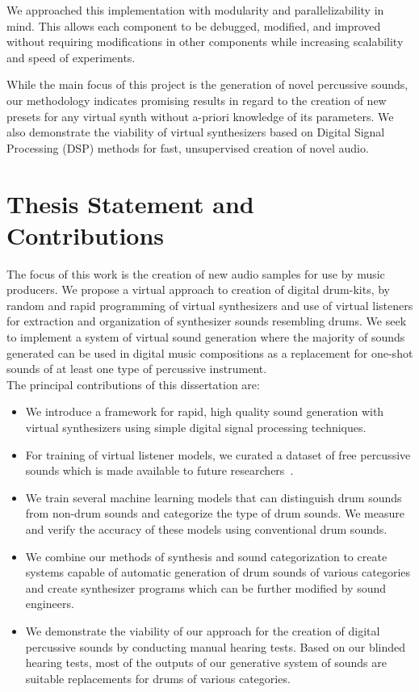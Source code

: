 \documentclass[\main/thesis.tex]{subfiles}
\begin{document}
We approached this implementation with modularity and parallelizability in mind. This allows each component to be debugged, modified, and improved without requiring modifications in other components while increasing scalability and speed of experiments. 


While the main focus of this project is the generation of novel percussive sounds, our methodology indicates promising results in regard to the creation of new presets for any virtual synth without a-priori knowledge of its parameters. We also demonstrate the viability of virtual synthesizers based on Digital Signal Processing (DSP) methods for fast, unsupervised creation of novel audio. 




\section{Thesis Statement and Contributions}
\label{sec:thesis_statement}
 The focus of this work is the creation of new audio samples for use by music producers. We propose a virtual approach to creation of digital drum-kits, by random and rapid programming of virtual synthesizers and use of virtual listeners for extraction and organization of synthesizer sounds resembling drums. We seek to implement a system of virtual sound generation where the majority of sounds generated can be used in digital music compositions as a replacement for one-shot sounds of at least one type of percussive instrument.\\
  
  The principal contributions of this dissertation are:
\begin{itemize}
  \item We introduce a framework for rapid, high quality sound generation with virtual synthesizers using simple digital signal processing techniques. 
  \item For training of virtual listener models, we curated a dataset of free percussive sounds which is made available to future researchers~\cite{salimihindle_drums}. 
  \item We train several machine learning models that can distinguish drum sounds from non-drum sounds and categorize the type of drum sounds. We measure and verify the accuracy of these models using conventional drum sounds. 
  \item We combine our methods of synthesis and sound categorization to create systems capable of automatic generation of drum sounds of various categories and create synthesizer programs which can be further modified by sound engineers.
  \item We demonstrate the viability of our approach for the creation of digital percussive sounds by conducting manual hearing tests. Based on our blinded hearing tests, most of the outputs of our generative system of sounds are suitable replacements for drums of various categories. 
\end{itemize}
\end{document}
